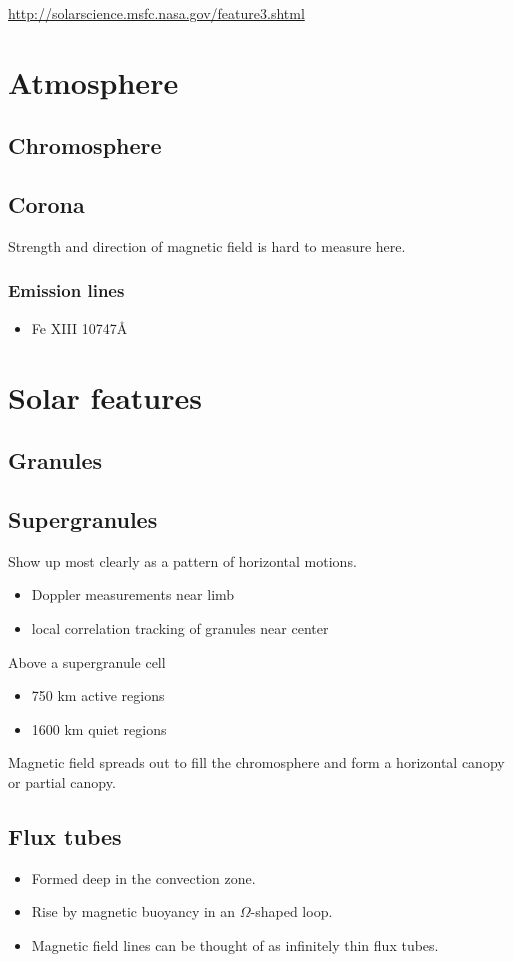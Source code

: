 \documentclass{article}
\begin{document}
\tableofcontents
\url{http://solarscience.msfc.nasa.gov/feature3.shtml}
\newpage
\hypersetup{linkcolor=darkpowderblue}


\section{Atmosphere}
\subsection{Chromosphere}
\subsection{Corona}
Strength and direction of magnetic field is hard to measure here.

\subsubsection{Emission lines}
\begin{itemize}
    \item Fe XIII 10747\AA{}
\end{itemize}

\section{Solar features}
\subsection{Granules}
\subsection{Supergranules}
Show up most clearly as a pattern of horizontal motions.
\begin{itemize}
    \item Doppler measurements near limb
    \item local correlation tracking of granules near center
\end{itemize}
Above a supergranule cell
\begin{itemize}
    \item 750 km active regions
    \item 1600 km quiet regions
\end{itemize}
Magnetic field spreads out to fill the chromosphere and form a
horizontal canopy or partial canopy.

\subsection{Flux tubes}
    \begin{itemize}
        \item Formed deep in the convection zone.
        \item Rise by magnetic buoyancy in an $\Omega$-shaped loop.
        \item Magnetic field lines can be thought of as infinitely
          thin flux tubes.
    \end{itemize}
\end{document}
